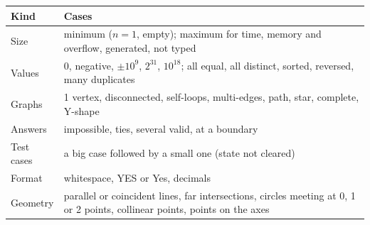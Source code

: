 {%
\noindent\begin{tabular}{@{}l p{6.6cm}@{}}
\toprule
Kind & Cases \\
\midrule
Size & minimum ($n = 1$, empty); maximum for time, memory and overflow, generated, not typed \\
Values & $0$, negative, $\pm 10^9$, $2^{31}$, $10^{18}$; all equal, all distinct, sorted, reversed, many duplicates \\
Graphs & 1 vertex, disconnected, self-loops, multi-edges, path, star, complete, Y-shape \\
Answers & impossible, ties, several valid, at a boundary \\
Test cases & a big case followed by a small one (state not cleared) \\
Format & whitespace, YES or Yes, decimals \\
Geometry & parallel or coincident lines, far intersections, circles meeting at 0, 1 or 2 points, collinear points, points on the axes \\
\bottomrule
\end{tabular}
}
